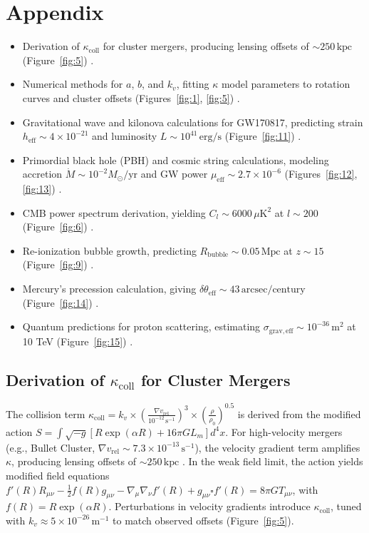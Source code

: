 \documentclass[a4paper,12pt]{article}
\begin{document}
\section{Appendix}
\begin{itemize}
    \item Derivation of \texorpdfstring{$\kappa_{\mathrm{coll}}$}{kappacoll} for cluster mergers, producing lensing offsets of $\sim 250 \, \text{kpc}$ (Figure~\ref{fig:5}) \citep{Clowe2006}.
    \item Numerical methods for \texorpdfstring{$a$, $b$, and $k_v$}{a, b, and kv}, fitting $\kappa$ model parameters to rotation curves and cluster offsets (Figures~\ref{fig:1}, \ref{fig:5}) \citep{Carnall2024,Clowe2006}.
    \item Gravitational wave and kilonova calculations for GW170817, predicting strain $h_{\mathrm{eff}} \sim 4 \times 10^{-21}$ and luminosity $L \sim 10^{41} \, \text{erg/s}$ (Figure~\ref{fig:11}) \citep{LIGO2017,Metzger2017}.
    \item Primordial black hole (PBH) and cosmic string calculations, modeling accretion $\dot{M} \sim 10^{-2} M_\odot/\text{yr}$ and GW power $\mu_{\mathrm{eff}} \sim 2.7 \times 10^{-6}$ (Figures~\ref{fig:12}, \ref{fig:13}) \citep{Carr2020}.
    \item CMB power spectrum derivation, yielding $C_l \sim 6000 \, \mu\text{K}^2$ at $l \sim 200$ (Figure~\ref{fig:6}) \citep{Planck2020}.
    \item Re-ionization bubble growth, predicting $R_{\mathrm{bubble}} \sim 0.05 \, \text{Mpc}$ at $z \sim 15$ (Figure~\ref{fig:9}) \citep{Robertson2022}.
    \item Mercury’s precession calculation, giving $\delta\theta_{\mathrm{eff}} \sim 43 \, \text{arcsec/century}$ (Figure~\ref{fig:14}) \citep{Clemence1947}.
    \item Quantum predictions for proton scattering, estimating $\sigma_{\mathrm{grav,eff}} \sim 10^{-36} \, \text{m}^2$ at 10 TeV (Figure~\ref{fig:15}) \citep{Aad2019}.
\end{itemize}

\subsection{Derivation of \texorpdfstring{$\kappa_{\mathrm{coll}}$}{kappacoll} for Cluster Mergers}
The collision term $\kappa_{\mathrm{coll}} = k_v \times \left( \frac{\nabla v_{\mathrm{rel}}}{10^{-12} \, \text{s}^{-1}} \right)^3 \times \left( \frac{\rho}{\rho_0} \right)^{0.5}$ is derived from the modified action $S = \int \sqrt{-g} \left[ R \exp(\alpha R) + 16\pi G L_m \right] d^4x$. For high-velocity mergers (e.g., Bullet Cluster, $\nabla v_{\mathrm{rel}} \sim 7.3 \times 10^{-13} \, \text{s}^{-1}$), the velocity gradient term amplifies $\kappa$, producing lensing offsets of $\sim 250 \, \text{kpc}$ \citep{Clowe2006}. In the weak field limit, the action yields modified field equations $f'(R) R_{\mu\nu} - \frac{1}{2} f(R) g_{\mu\nu} - \nabla_\mu \nabla_\nu f'(R) + g_{\mu\nu} \square f'(R) = 8\pi G T_{\mu\nu}$, with $f(R) = R \exp(\alpha R)$. Perturbations in velocity gradients introduce $\kappa_{\mathrm{coll}}$, tuned with $k_v \approx 5 \times 10^{-26} \, \text{m}^{-1}$ to match observed offsets (Figure~\ref{fig:5}).
\end{document}
